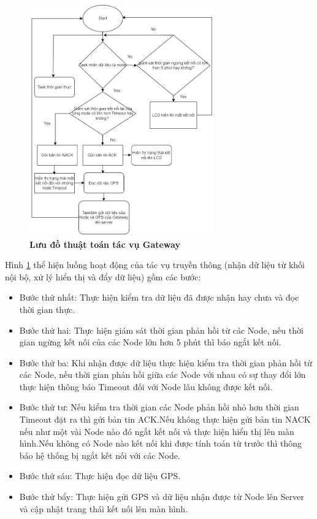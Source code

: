 \documentclass{article} %
\begin{document}
\begin{itemize}
		\begin{figure}[!ht]
			\centering
			\includegraphics[width=8cm,height=10cm]{Images/FirmGate.png}
			\caption[ Lưu đồ thuật toán tác vụ  Gateway ]{\bfseries \fontsize{12pt}{0pt}\selectfont  Lưu đồ thuật toán tác vụ Gateway}
			\label{FirmGate}
		\end{figure}
		\newpage
		Hình \ref{FirmGate} thể hiện luồng hoạt động của tác vụ truyền thông (nhận dữ liệu từ khối nội bộ, xử lý hiển thị và đẩy dữ liệu) gồm các bước:
		\begin{itemize}[label=$\ast$]
			\item Bước thứ nhất: Thực hiện kiểm tra dữ liệu đã được nhận hay chưa và đọc thời gian thực.
			\item Bước thứ hai: Thực hiện giám sát thời gian phản hồi từ các Node, nếu thời gian ngừng kết nối của các Node lớn hơn 5 phút thì báo ngắt kết nối.
			\item Bước thứ ba: Khi nhận được dữ liệu thực hiện kiểm tra thời gian phản hồi từ các Node, nếu thời gian phản hồi giữa các Node với nhau có sự thay đổi lớn thực hiện thông báo Timeout đối với Node lâu không được kết nối.
			\item Bước thứ tư: Nếu kiểm tra thời gian các Node phản hồi nhỏ hơn thời gian Timeout đặt ra thì gửi bản tin ACK.Nếu không thực hiện gửi bản tin NACK nếu như một vài Node nào đó ngắt kết nối và thực hiện hiển thị lên màn hình.Nếu không có Node nào kết nối khi được tính toán từ trước thì thông báo hệ thống bị ngắt kết nối với các Node.
			\item Bước thứ sáu: Thực hiện đọc dữ liệu GPS. 
			\item Bước thứ bẩy: Thực hiện gửi GPS và dữ liệu nhận được từ Node lên Server và cập nhật trang thái kết nối lên màn hình.
		\end{itemize}
	\end{itemize}
\end{document}
